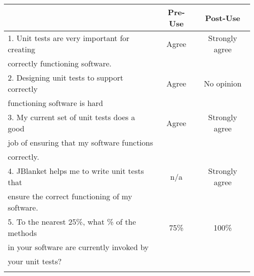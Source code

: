 \begin{tabular}{lcc} \\
 & {\bf Pre-Use} & {\bf Post-Use} \\ \hline
1. Unit tests are very important for creating & Agree & Strongly agree \\
   correctly functioning software. \\ \hline

2. Designing unit tests to support correctly & Agree & No opinion \\
   functioning software is hard\\ \hline

3. My current set of unit tests does a good & Agree & Strongly agree \\
   job of ensuring that my software functions \\
   correctly.\\ \hline

4. JBlanket helps me to write unit tests that & n/a & Strongly agree \\
   ensure the correct functioning of my software.\\ \hline

5. To the nearest 25\%, what \% of the methods & 75\% & 100\% \\
   in your software are currently invoked by \\
   your unit tests?\\ \hline
\\
\end{tabular}

